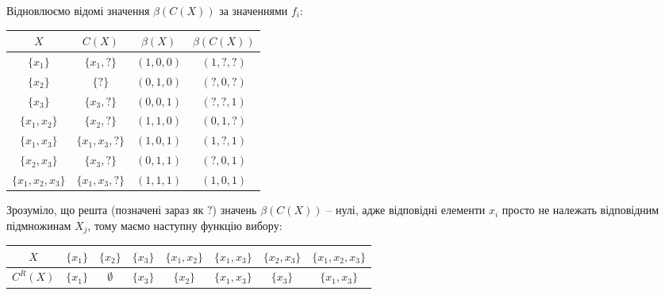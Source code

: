 \begin{solution}
    Відновлюємо відомі значення $\beta(C(X))$ за значеннями $f_i$:
    \begin{table}[H]
        \centering
        \begin{tabular}{|c|c|c|c|}
            \hline 
            $X$ & $C(X)$ & $\beta(X)$ & $\beta(C(X))$ \\ \hline
            $\{x_1\}$ & $\{x_1, ?\}$ & $(1, 0, 0)$ & $(1, ?, ?)$ \\
            $\{x_2\}$ & $\{?\}$ & $(0, 1, 0)$ & $(?, 0, ?)$ \\
            $\{x_3\}$ & $\{x_3, ?\}$ & $(0, 0, 1)$ & $(?, ?, 1)$ \\
            $\{x_1, x_2\}$ & $\{x_2, ?\}$ & $(1, 1, 0)$ & $(0, 1, ?)$ \\
            $\{x_1, x_3\}$ & $\{x_1, x_3, ?\}$ & $(1, 0, 1)$ & $(1, ?, 1)$ \\
            $\{x_2, x_3\}$ & $\{x_3, ?\}$ & $(0, 1, 1)$ & $(?, 0, 1)$ \\
            $\{x_1, x_2, x_3\}$ & $\{x_1, x_3, ?\}$ & $(1, 1, 1)$ & $(1, 0, 1)$ \\ \hline
        \end{tabular}
    \end{table}
    
    Зрозуміло, що решта (позначені зараз як $?$) значень $\beta(C(X))$ -- нулі, адже відповідні елементи $x_i$ просто не належать відповідним підмножинам $X_j$, тому маємо наступну функцію вибору:
    
    \begin{table}[H]
        \centering
        \begin{tabular}{|c|c|c|c|c|c|c|c|}
            \hline
            $X$ & $\{x_1\}$ & $\{x_2\}$ & $\{x_3\}$ & $\{x_1, x_2\}$ & $\{x_1, x_3\}$ & $\{x_2, x_3\}$ & $\{x_1, x_2, x_3\}$ \\ \hline
            $C^R(X)$ & $\{x_1\}$ & $\emptyset$ & $\{x_3\}$ & $\{x_2\}$ & $\{x_1, x_3\}$ & $\{x_3\}$ & $\{x_1, x_3\}$ \\ \hline
        \end{tabular}
    \end{table}
\end{solution}

\newpage